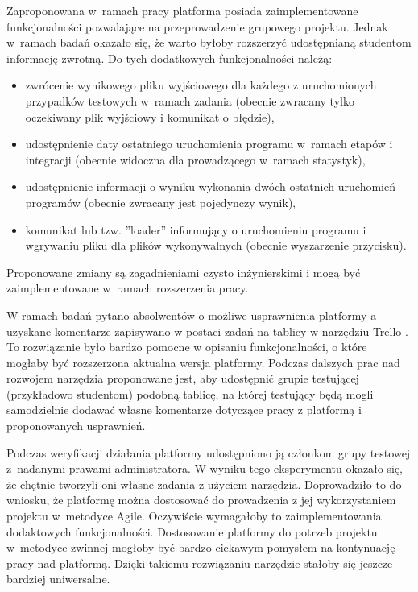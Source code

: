Zaproponowana w~ramach pracy platforma posiada zaimplementowane funkcjonalności pozwalające na przeprowadzenie grupowego projektu.
Jednak w~ramach badań okazało się, że warto byłoby rozszerzyć udostępnianą studentom informację zwrotną.
Do tych dodatkowych funkcjonalności należą:
\begin{itemize}
    \item zwrócenie wynikowego pliku wyjściowego dla każdego z uruchomionych przypadków testowych w~ramach zadania (obecnie zwracany tylko oczekiwany plik wyjściowy i komunikat o błędzie),
    \item udostępnienie daty ostatniego uruchomienia programu w~ramach etapów i integracji (obecnie widoczna dla prowadzącego w~ramach statystyk),
    \item udostępnienie informacji o wyniku wykonania dwóch ostatnich uruchomień programów (obecnie zwracany jest pojedynczy wynik),
    \item komunikat lub tzw. ”loader” informujący o uruchomieniu programu i wgrywaniu pliku dla plików wykonywalnych (obecnie wyszarzenie przycisku).
\end{itemize}
Proponowane zmiany są zagadnieniami czysto inżynierskimi i mogą być zaimplementowane w~ramach rozszerzenia pracy.

W ramach badań pytano absolwentów o możliwe usprawnienia platformy a uzyskane komentarze zapisywano w postaci zadań na tablicy w narzędziu Trello \cite{trello}.
To rozwiązanie było bardzo pomocne w opisaniu funkcjonalności, o które mogłaby być rozszerzona aktualna wersja  platformy.
Podczas dalszych prac nad rozwojem narzędzia proponowane jest, aby udostępnić grupie testującej (przykładowo studentom) podobną tablicę, na której testujący będą mogli samodzielnie dodawać własne komentarze dotyczące pracy z platformą i proponowanych usprawnień.

Podczas weryfikacji działania platformy udostępniono ją członkom grupy testowej z~nadanymi prawami administratora.
W wyniku tego eksperymentu okazało się, że chętnie tworzyli oni własne zadania z użyciem narzędzia.
Doprowadziło to do wniosku, że platformę można dostosować do prowadzenia z jej wykorzystaniem projektu w~metodyce Agile.
Oczywiście wymagałoby to zaimplementowania dodaktowych funkcjonalności.
Dostosowanie platformy do potrzeb projektu w~metodyce zwinnej mogłoby być bardzo ciekawym pomysłem na kontynuację pracy nad platformą.
Dzięki takiemu rozwiązaniu narzędzie stałoby się jeszcze bardziej uniwersalne.






